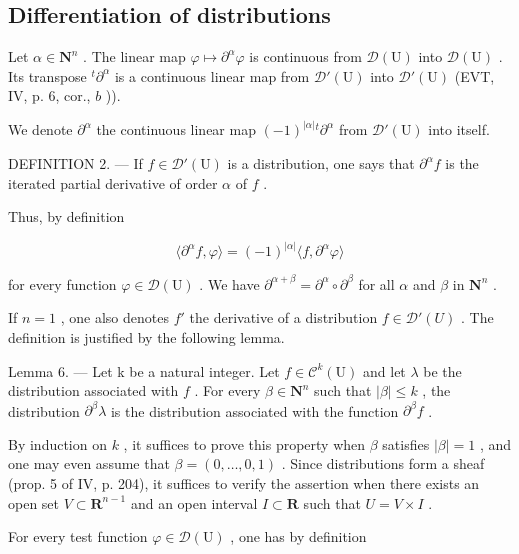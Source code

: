 \subsection{Differentiation of distributions}

Let \(\alpha \in \mathbf{N}^n\) . The linear map \(\varphi \mapsto \partial^\alpha \varphi\) is continuous from \(\mathcal{D}(\mathrm{U})\) into \(\mathcal{D}(\mathrm{U})\) . Its transpose \(^t\partial^\alpha\) is a continuous linear map from \(\mathcal{D}'(\mathrm{U})\) into \(\mathcal{D}'(\mathrm{U})\) (EVT, IV, p. 6, cor., \(b\) )).

We denote \(\partial^{\alpha}\) the continuous linear map \((-1)^{|\alpha|}{}^{t}\partial^{\alpha}\) from \(\mathcal{D}'(\mathrm{U})\) into itself.

DEFINITION 2. --- If \(f \in \mathcal{D}'(\mathrm{U})\) is a distribution, one says that \(\partial^{\alpha} f\) is the iterated partial derivative of order \(\alpha\) of \(f\) .

Thus, by definition

\[
\langle \partial^ {\alpha} f, \varphi \rangle = (- 1) ^ {| \alpha |} \langle f, \partial^ {\alpha} \varphi \rangle
\]

for every function \(\varphi\in\mathcal{D}(\mathrm{U})\) . We have \(\partial^{\alpha+\beta}=\partial^{\alpha}\circ\partial^{\beta}\) for all \(\alpha\) and \(\beta\) in \(\mathbf{N}^{n}\) .

If \(n=1\) , one also denotes \(f'\) the derivative of a distribution \(f\in\mathcal{D}'(U)\) . The definition is justified by the following lemma.

Lemma 6. --- Let k be a natural integer. Let \(f \in \mathcal{C}^k(\mathrm{U})\) and let \(\lambda\) be the distribution associated with \(f\) . For every \(\beta \in \mathbf{N}^n\) such that \(|\beta| \leqslant k\) , the distribution \(\partial^\beta\lambda\) is the distribution associated with the function \(\partial^\beta f\) .

By induction on \(k\) , it suffices to prove this property when \(\beta\) satisfies \(|\beta| = 1\) , and one may even assume that \(\beta = (0, \ldots, 0, 1)\) . Since distributions form a sheaf (prop. 5 of IV, p. 204), it suffices to verify the assertion when there exists an open set \(V \subset \mathbf{R}^{n-1}\) and an open interval \(I \subset \mathbf{R}\) such that \(U = V \times I\) .

For every test function \(\varphi\in\mathcal{D}(\mathrm{U})\) , one has by definition

